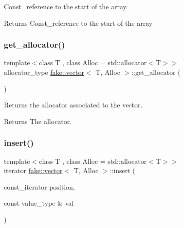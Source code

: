 Const\+\_\+reference to the start of the array. 

\begin{DoxyReturn}{Returns}
Const\+\_\+reference to the start of the array 
\end{DoxyReturn}
\mbox{\label{classfake_1_1vector_a1fbe6cb70f084552189f747b3130d86f}} 
\subsubsection{\texorpdfstring{get\+\_\+allocator()}{get\_allocator()}}
{\footnotesize\ttfamily template$<$class T , class Alloc  = std\+::allocator$<$\+T$>$$>$ \\
allocator\+\_\+type \mbox{\hyperlink{classfake_1_1vector}{fake\+::vector}}$<$ T, Alloc $>$\+::get\+\_\+allocator (\begin{DoxyParamCaption}{ }\end{DoxyParamCaption})\hspace{0.3cm}{\ttfamily [inline]}}



Returns the allocator associated to the vector. 

\begin{DoxyReturn}{Returns}
The allocator. 
\end{DoxyReturn}
\mbox{\label{classfake_1_1vector_a1d09e69dcdbdcee51e53315a3c2c059e}} 
\subsubsection{\texorpdfstring{insert()}{insert()}\hspace{0.1cm}{\footnotesize\ttfamily [1/5]}}
{\footnotesize\ttfamily template$<$class T , class Alloc  = std\+::allocator$<$\+T$>$$>$ \\
iterator \mbox{\hyperlink{classfake_1_1vector}{fake\+::vector}}$<$ T, Alloc $>$\+::insert (\begin{DoxyParamCaption}\item[{const\+\_\+iterator}]{position,  }\item[{const value\+\_\+type \&}]{val }\end{DoxyParamCaption})\hspace{0.3cm}{\ttfamily [inline]}}



